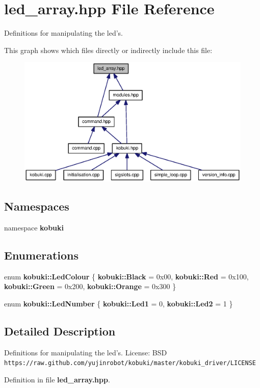 \section{led\-\_\-array.\-hpp \-File \-Reference}
\label{led__array_8hpp}


\-Definitions for manipulating the led's.  


\-This graph shows which files directly or indirectly include this file\-:
\nopagebreak
\begin{figure}[H]
\begin{center}
\leavevmode
\includegraphics[width=350pt]{led__array_8hpp__dep__incl}
\end{center}
\end{figure}
\subsection*{\-Namespaces}
\begin{DoxyCompactItemize}
\item 
namespace {\bf kobuki}
\end{DoxyCompactItemize}
\subsection*{\-Enumerations}
\begin{DoxyCompactItemize}
\item 
enum {\bf kobuki\-::\-Led\-Colour} \{ {\bf kobuki\-::\-Black} =  0x00, 
{\bf kobuki\-::\-Red} =  0x100, 
{\bf kobuki\-::\-Green} =  0x200, 
{\bf kobuki\-::\-Orange} =  0x300
 \}
\item 
enum {\bf kobuki\-::\-Led\-Number} \{ {\bf kobuki\-::\-Led1} =  0, 
{\bf kobuki\-::\-Led2} =  1
 \}
\end{DoxyCompactItemize}


\subsection{\-Detailed \-Description}
\-Definitions for manipulating the led's. \-License\-: \-B\-S\-D {\tt https\-://raw.\-github.\-com/yujinrobot/kobuki/master/kobuki\-\_\-driver/\-L\-I\-C\-E\-N\-S\-E} 

\-Definition in file {\bf led\-\_\-array.\-hpp}.

